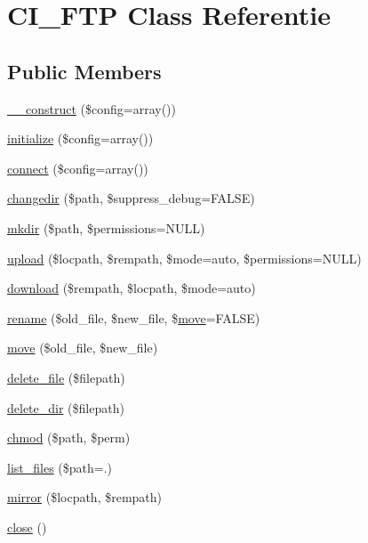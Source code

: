 \hypertarget{class_c_i___f_t_p}{}\section{C\+I\+\_\+\+F\+TP Class Referentie}
\label{class_c_i___f_t_p}
\subsection*{Public Members}
\begin{DoxyCompactItemize}
\item 
\mbox{\hyperlink{class_c_i___f_t_p_af7f9493844d2d66e924e3c1df51ce616}{\+\_\+\+\_\+construct}} (\$config=array())
\item 
\mbox{\hyperlink{class_c_i___f_t_p_a481385e36d920f5a5005ace05c6cd016}{initialize}} (\$config=array())
\item 
\mbox{\hyperlink{class_c_i___f_t_p_ab2827759611aaaf0c59e69661122c534}{connect}} (\$config=array())
\item 
\mbox{\hyperlink{class_c_i___f_t_p_a81098bf710d7879da8d69130f136475b}{changedir}} (\$path, \$suppress\+\_\+debug=F\+A\+L\+SE)
\item 
\mbox{\hyperlink{class_c_i___f_t_p_a077f5ce3771d83b8196e07ccc27e49ff}{mkdir}} (\$path, \$permissions=N\+U\+LL)
\item 
\mbox{\hyperlink{class_c_i___f_t_p_a6e11a64f2c0a3f8f1659f4e32032031d}{upload}} (\$locpath, \$rempath, \$mode=\textquotesingle{}auto\textquotesingle{}, \$permissions=N\+U\+LL)
\item 
\mbox{\hyperlink{class_c_i___f_t_p_aefb1987159bc6c547d8c02b2e5aa2f25}{download}} (\$rempath, \$locpath, \$mode=\textquotesingle{}auto\textquotesingle{})
\item 
\mbox{\hyperlink{class_c_i___f_t_p_aa670f7340bb15f61d481f4b3c64bd9dc}{rename}} (\$old\+\_\+file, \$new\+\_\+file, \$\mbox{\hyperlink{class_c_i___f_t_p_acb1443339c3058c83b79f0f503630920}{move}}=F\+A\+L\+SE)
\item 
\mbox{\hyperlink{class_c_i___f_t_p_acb1443339c3058c83b79f0f503630920}{move}} (\$old\+\_\+file, \$new\+\_\+file)
\item 
\mbox{\hyperlink{class_c_i___f_t_p_aad793fb503643d98b58426421718e18a}{delete\+\_\+file}} (\$filepath)
\item 
\mbox{\hyperlink{class_c_i___f_t_p_af09b3ab08984b145506dcff4f75a051c}{delete\+\_\+dir}} (\$filepath)
\item 
\mbox{\hyperlink{class_c_i___f_t_p_a9af83eefaf53c7362e7108d1f82bf1ab}{chmod}} (\$path, \$perm)
\item 
\mbox{\hyperlink{class_c_i___f_t_p_a2a40473caefcd36b60e3e96b3395975c}{list\+\_\+files}} (\$path=\textquotesingle{}.\textquotesingle{})
\item 
\mbox{\hyperlink{class_c_i___f_t_p_aea2de30bbdf050cb607bbc5a36772bf3}{mirror}} (\$locpath, \$rempath)
\item 
\mbox{\hyperlink{class_c_i___f_t_p_aa69c8bf1f1dcf4e72552efff1fe3e87e}{close}} ()
\end{DoxyCompactItemize}
